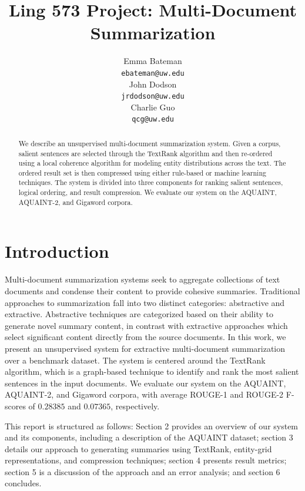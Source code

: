 \documentclass[11pt]{article}
\title{Ling 573 Project: Multi-Document Summarization}
\author{Emma Bateman \\
  {\tt ebateman@uw.edu} \\\And
  John Dodson \\
  {\tt jrdodson@uw.edu} \\\And
  Charlie Guo \\
  {\tt qcg@uw.edu}
  }
\date{}
\begin{document}
\maketitle
\begin{abstract}
We describe an unsupervised multi-document summarization system. Given a corpus, salient sentences are selected through the TextRank algorithm and then re-ordered using a local coherence algorithm for modeling entity distributions across the text. The ordered result set is then compressed using either rule-based or machine learning techniques. The system is divided into three components for ranking salient sentences, logical ordering, and result compression. We evaluate our system on the AQUAINT, AQUAINT-2, and Gigaword corpora.
\end{abstract}

\section{Introduction}

Multi-document summarization systems seek to aggregate collections of text documents and condense their content to provide cohesive summaries. Traditional approaches to summarization fall into two distinct categories: abstractive and extractive. Abstractive techniques are categorized based on their ability to generate novel summary content, in contrast with extractive approaches which select significant content directly from the source documents. In this work, we present an unsupervised system for extractive multi-document summarization over a benchmark dataset. The system is centered around the TextRank algorithm, which is a graph-based technique to identify and rank the most salient sentences in the input documents. We evaluate our system on the AQUAINT, AQUAINT-2, and Gigaword corpora, with average ROUGE-1 and ROUGE-2 F-scores of $0.28385$ and $0.07365$, respectively. 

This report is structured as follows: Section 2 provides an overview of our system and its components, including a description of the AQUAINT dataset; section 3 details our approach to generating summaries using TextRank, entity-grid representations, and compression techniques; section 4 presents result metrics; section 5 is a discussion of the approach and an error analysis; and section 6 concludes.
\end{document}
